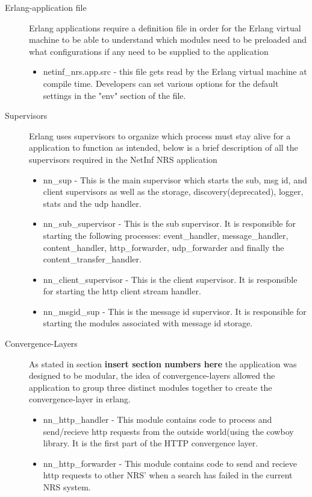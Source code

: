 \begin{description}
\item[Erlang-application file]
Erlang applications require a definition file in order for the Erlang virtual machine to be able to understand which modules need to be preloaded and what configurations if any need to be supplied to the application
\begin{itemize}
\item netinf\_nrs.app.src - this file gets read by the Erlang virtual machine at compile time. Developers can set various options for the default settings in the "env" section of the file.
\end{itemize}
\item[Supervisors]
Erlang uses supervisors to organize which process must stay alive for a application to function as intended, below is a brief description of all the supervisors required in the NetInf NRS application
\begin{itemize}
\item nn\_sup - This is the main supervisor which starts the sub, msg id, and client supervisors as well as the storage, discovery(deprecated), logger, stats and the udp handler.
\item nn\_sub\_supervisor - This is the sub supervisor. It is responsible for starting the following processes: event\_handler, message\_handler, content\_handler, http\_forwarder, udp\_forwarder and finally the content\_transfer\_handler.
\item nn\_client\_supervisor - This is the client supervisor. It is responsible for starting the http client stream handler. 
\item nn\_msgid\_sup - This is the message id supervisor. It is responsible for starting the modules associated with message id storage.
\end{itemize}
\item[Convergence-Layers]
As stated in section \textbf{insert section numbers here} the application was designed to be modular, the idea of convergence-layers allowed the application to group three distinct modules together to create the convergence-layer in erlang.
\begin{itemize}
\item nn\_http\_handler - This module contains code to process and send/recieve http requests from the outside world(using the cowboy library. It is the first part of the HTTP convergence layer.
\item nn\_http\_forwarder - This module contains code to send and recieve http requests to other NRS' when a search has failed in the current NRS system.

\end{itemize}
\end{description}
